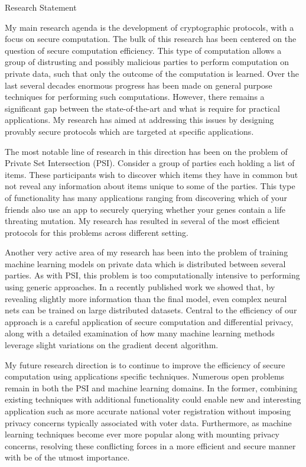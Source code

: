 \documentclass{resume} %
\begin{document}
	
	
	\begin{rSection}{Research Statement}
		
		My main research agenda is the development of cryptographic protocols, with a focus on secure computation. The bulk of this research has been centered on the question of secure computation efficiency. This type of computation allows a group of distrusting and possibly malicious parties to perform computation on private data, such that only the outcome of the computation is learned. Over the last several decades enormous progress has been made on general purpose techniques for performing such computations. However, there remains a significant gap between the state-of-the-art and what is require for practical applications. My research has aimed at addressing this issues by designing provably secure protocols which are targeted at specific applications.
		
		The most notable line of research in this direction has been on the problem of Private Set Intersection (PSI). Consider a group of parties each holding a list of items. These participants wish to discover which items they have in common but not reveal any  information about items unique to some of the parties. This type of functionality has many applications ranging from discovering which of your friends also use an app to securely querying whether your genes contain a life threating mutation. My research has resulted in several of the most efficient protocols for this problems across different setting.
		
		Another very active area of my research has been into the problem of training machine learning models on private data which is distributed between several parties. As with PSI, this problem is too computationally intensive to performing using generic approaches. In a recently published work we showed that, by revealing slightly more information than the final model, even complex neural nets can be trained on large distributed datasets. Central to the efficiency of our approach is a careful application of secure computation and differential privacy, along with a detailed examination of how many machine learning methods leverage slight variations on the gradient decent algorithm.  
		
		My future research direction is to continue to improve the efficiency of secure computation using applications specific techniques. Numerous open problems remain in both the PSI and machine learning domains. In the former, combining existing techniques with additional functionality could enable new and interesting application such as more accurate national voter registration without imposing privacy concerns typically associated with voter data. Furthermore, as machine learning techniques become ever more popular along with mounting privacy concerns, resolving these conflicting  forces in a more efficient and secure manner with be of the utmost importance.
		
		
		
	\end{rSection}
	
\end{document}
